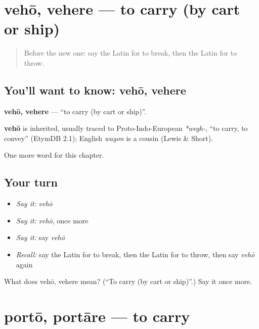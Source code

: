 \section[vehō, vehere]{vehō, vehere — to carry (by cart or ship)}

\label{lesson:LA-C156-veho}



\begin{quote}
Before the new one: say the Latin for to break, then the Latin for to throw.
\end{quote}

\subsection*{You'll want to know: vehō, vehere}
\textbf{vehō, vehere} — \textquotedblleft{}to carry (by cart or ship)\textquotedblright{}.

\begin{cousinweb}
\textbf{vehō} is inherited, usually traced to Proto-Indo-European \emph{*wegh-}, \textquotedblleft{}to carry, to convey\textquotedblright{} (EtymDB 2.1); English \emph{wagon} is a cousin (Lewis \& Short).
\end{cousinweb}

\begin{grammarlens}[title={What you've built}]
One more word for this chapter.
\end{grammarlens}

\subsection*{Your turn}
\begin{itemize}
\raggedright
  \item \emph{Say it:} \emph{vehō}
  \item \emph{Say it:} \emph{vehō}, once more
  \item \emph{Say it:} say \emph{vehō}
  \item \emph{Recall:} say the Latin for to break, then the Latin for to throw, then say \emph{vehō} again
\end{itemize}

\begin{tcolorbox}[breakable,colback=teal!4,colframe=teal!35!black,title={Before you move on}]
What does vehō, vehere mean? (\textquotedblleft{}To carry (by cart or ship)\textquotedblright{}.) Say it once more.
\end{tcolorbox}
\section[portō, portāre]{portō, portāre — to carry}

